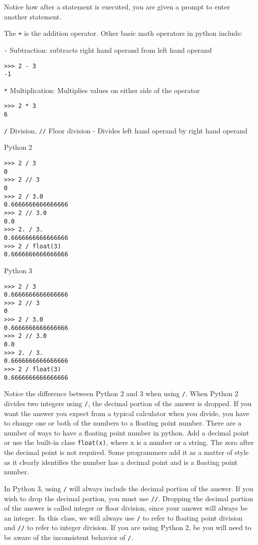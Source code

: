 \documentclass[12pt]{article}
\begin{document}
Notice how after a statement is executed, you are given a prompt to enter another statement.

The \texttt{+} is the addition operator. Other basic math operators in python include:

\texttt{-} Subtraction: subtracts right hand operand from left hand operand

\begin{lstlisting}[style=bash]
>>> 2 - 3
-1
\end{lstlisting}

\texttt{*} Multiplication: Multiplies values on either side of the operator

\begin{lstlisting}[style=bash]
>>> 2 * 3
6
\end{lstlisting}


\texttt{/} Division, \texttt{//} Floor division - Divides left hand operand by right hand operand

\begin{minipage}{.5\linewidth}
Python 2
\begin{lstlisting}[style=bash]
>>> 2 / 3
0
>>> 2 // 3
0
>>> 2 / 3.0
0.6666666666666666
>>> 2 // 3.0
0.0
>>> 2. / 3.
0.6666666666666666
>>> 2 / float(3)
0.6666666666666666
\end{lstlisting}
\end{minipage}
\begin{minipage}{.5\linewidth}
Python 3
\begin{lstlisting}[style=bash]
>>> 2 / 3
0.6666666666666666
>>> 2 // 3
0
>>> 2 / 3.0
0.6666666666666666
>>> 2 // 3.0
0.0
>>> 2. / 3.
0.6666666666666666
>>> 2 / float(3)
0.6666666666666666
\end{lstlisting}
\end{minipage}

Notice the difference between Python 2 and 3 when using \texttt{/}. When Python 2 divides two integers using \texttt{/}, the decimal portion of the answer is dropped. If you want the answer you expect from a typical calculator when you divide, you have to change one or both of the numbers to a floating point number. There are a number of ways to have a floating point number in python. Add a decimal point or use the built-in class \texttt{float(x)}, where x is a number or a string. The zero after the decimal point is not required. Some programmers add it as a matter of style as it clearly identifies the number has a decimal point and is a floating point number.

In Python 3, using \texttt{/} will always include the decimal portion of the answer. If you wish to drop the decimal portion, you must use \texttt{//}. Dropping the decimal portion of the answer is called integer or floor division, since your answer will always be an integer. In this class, we will always use \texttt{/} to refer to floating point division and \texttt{//} to refer to integer division. If you are using Python 2, be you will need to be aware of the inconsistent behavior of \texttt{/}.
\end{document}
